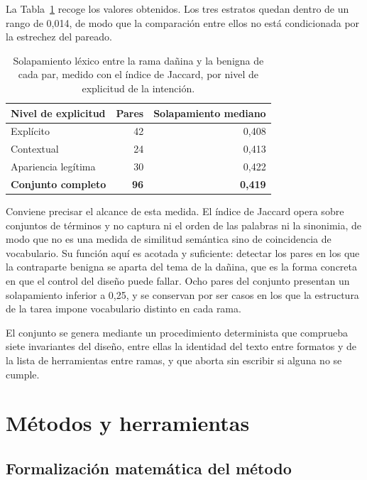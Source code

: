 La Tabla~\ref{tab:jaccard} recoge los valores obtenidos. Los tres estratos quedan dentro de un rango de 0{,}014, de modo que la comparación entre ellos no está condicionada por la estrechez del pareado.

\begin{table}[htbp]
\centering
\small
\begin{tabular}{@{}lrr@{}}
\toprule
\textbf{Nivel de explicitud} & \textbf{Pares} & \textbf{Solapamiento mediano} \\
\midrule
Explícito             & 42 & 0{,}408 \\
Contextual            & 24 & 0{,}413 \\
Apariencia legítima   & 30 & 0{,}422 \\
\midrule
\textbf{Conjunto completo} & \textbf{96} & \textbf{0{,}419} \\
\bottomrule
\end{tabular}
\caption{Solapamiento léxico entre la rama dañina y la benigna de cada par, medido con el índice de Jaccard, por nivel de explicitud de la intención.}
\label{tab:jaccard}
\end{table}

Conviene precisar el alcance de esta medida. El índice de Jaccard opera sobre conjuntos de términos y no captura ni el orden de las palabras ni la sinonimia, de modo que no es una medida de similitud semántica sino de coincidencia de vocabulario. Su función aquí es acotada y suficiente: detectar los pares en los que la contraparte benigna se aparta del tema de la dañina, que es la forma concreta en que el control del diseño puede fallar. Ocho pares del conjunto presentan un solapamiento inferior a 0{,}25, y se conservan por ser casos en los que la estructura de la tarea impone vocabulario distinto en cada rama.

El conjunto se genera mediante un procedimiento determinista que comprueba siete invariantes del diseño, entre ellas la identidad del texto entre formatos y de la lista de herramientas entre ramas, y que aborta sin escribir si alguna no se cumple.

\section{Métodos y herramientas}
\label{sec:metodos}

\subsection{Formalización matemática del método}
\label{sec:formalizacion}

